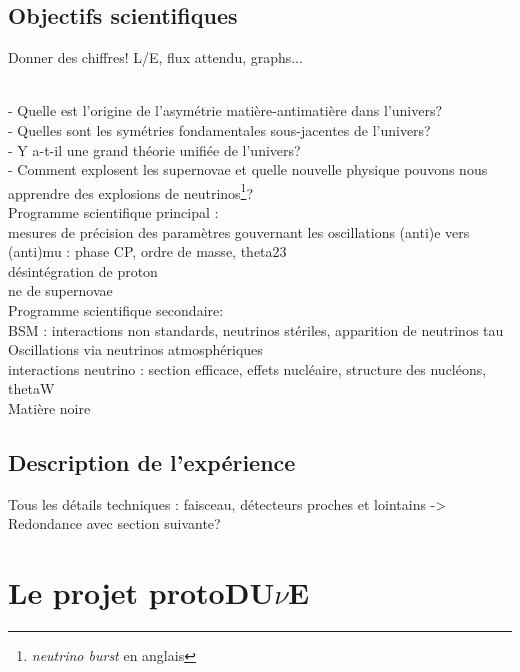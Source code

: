         \subsection{Objectifs scientifiques}
            Donner des chiffres! L/E, flux attendu, graphs...
        
            \cite{lbnf_vol2}\\
            - Quelle est l'origine de l'asymétrie matière-antimatière dans l'univers?\\
            - Quelles sont les symétries fondamentales sous-jacentes de l'univers?\\
            - Y a-t-il une grand théorie unifiée de l'univers?\\
            - Comment explosent les supernovae et quelle nouvelle physique pouvons nous apprendre des explosions de neutrinos\footnote{\textit{neutrino burst} en anglais}?\\
            
            Programme scientifique principal :\\ mesures de précision des paramètres gouvernant les oscillations (anti)e vers (anti)mu : phase CP, ordre de masse, theta23\\
            désintégration de proton\\
            ne de supernovae\\
            
            Programme scientifique secondaire:\\
            BSM : interactions non standards, neutrinos stériles, apparition de neutrinos tau\\
            Oscillations via neutrinos atmosphériques\\
            interactions neutrino : section efficace, effets nucléaire, structure des nucléons, thetaW\\
            Matière noire
            
        
        \subsection{Description de l'expérience}
            Tous les détails techniques : faisceau, détecteurs proches et lointains
            -> Redondance avec section suivante?
    
    \section{Le projet protoDU$\nu$E}
    
